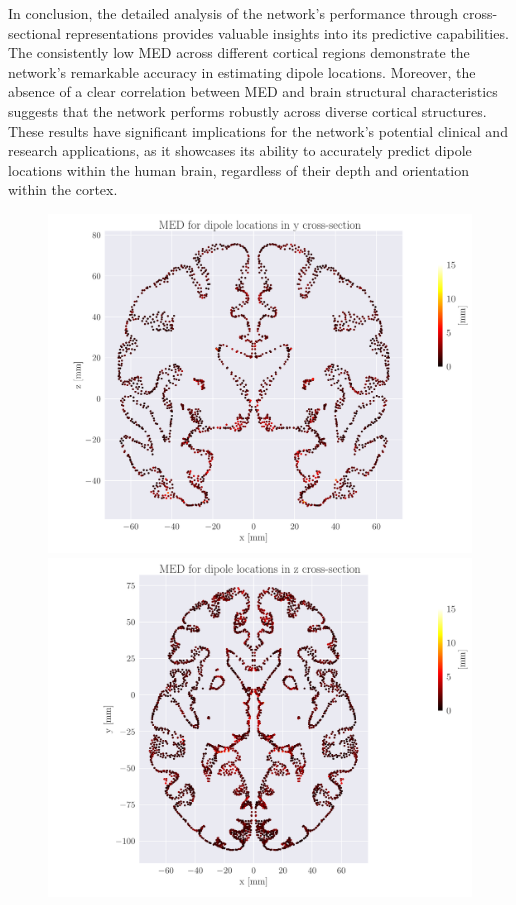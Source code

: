 \documentclass[a4paper, UKenglish, 11pt]{uiomaster}
\begin{document}
In conclusion, the detailed analysis of the network's performance through cross-sectional representations provides valuable insights into its predictive capabilities. The consistently low MED across different cortical regions demonstrate the network's remarkable accuracy in estimating dipole locations. Moreover, the absence of a clear correlation between MED and brain structural characteristics suggests that the network performs robustly across diverse cortical structures. These results have significant implications for the network's potential clinical and research applications, as it showcases its ability to accurately predict dipole locations within the human brain, regardless of their depth and orientation within the cortex.

\begin{figure}[!htb]
    \centering
    \includegraphics[width=0.7\linewidth]{figures/MED_simple_dipole_error_Euclidean Distance_0.pdf}
    \vspace{10pt} %
    \includegraphics[width=0.7\linewidth]{figures/MED_simple_dipole_error_Euclidean Distance_1.pdf}
    \vspace{10pt} %

\end{figure}
\end{document}

